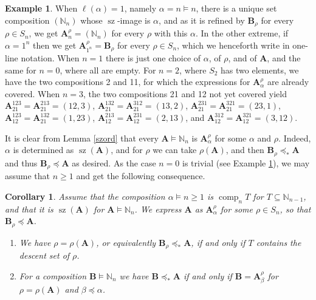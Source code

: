 \documentclass{article}
\newtheorem{cor}[thm]{Corollary}
\theoremstyle{definition}
\newtheorem{ex}[thm]{Example}
\begin{document}
\begin{ex}
When $\ell(\alpha)=1$, namely $\alpha=n \vDash n$, there is a unique set composition $(\mathbb{N}_{n})$ whose $\operatorname{sz}$-image is $\alpha$, and as it is refined by $\mathbf{B}_{\rho}$ for every $\rho \in S_{n}$, we get $\mathbf{A}_{n}^{\rho}=(\mathbb{N}_{n})$ for every $\rho$ with this $\alpha$. In the other extreme, if $\alpha=1^{n}$ then we get $\mathbf{A}_{1^{n}}^{\rho}=\mathbf{B}_{\rho}$ for every $\rho \in S_{n}$, which we henceforth write in one-line notation. When $n=1$ there is just one choice of $\alpha$, of $\rho$, and of $\mathbf{A}$, and the same for $n=0$, where all are empty. For $n=2$, where $S_{2}$ has two elements, we have the two compositions 2 and 11, for which the expressions for $\mathbf{A}_{\alpha}^{\rho}$ are already covered. When $n=3$, the two compositions 21 and 12 not yet covered yield $\mathbf{A}_{21}^{123}=\mathbf{A}_{21}^{213}=(12,3)$, $\mathbf{A}_{21}^{132}=\mathbf{A}_{21}^{312}=(13,2)$, $\mathbf{A}_{21}^{231}=\mathbf{A}_{21}^{321}=(23,1)$, $\mathbf{A}_{12}^{123}=\mathbf{A}_{21}^{132}=(1,23)$, $\mathbf{A}_{12}^{213}=\mathbf{A}_{12}^{231}=(2,13)$, and $\mathbf{A}_{12}^{312}=\mathbf{A}_{12}^{321}=(3,12)$. \label{Aalpharhoex}
\end{ex}
It is clear from Lemma \ref{szord} that every $\mathbf{A}\vDash\mathbb{N}_{n}$ is $\mathbf{A}_{\alpha}^{\rho}$ for some $\alpha$ and $\rho$. Indeed, $\alpha$ is determined as $\operatorname{sz}(\mathbf{A})$, and for $\rho$ we can take $\rho(\mathbf{A})$, and then $\mathbf{B}_{\rho}\preceq_{*}\mathbf{A}$ and thus $\mathbf{B}_{\rho}\preceq\mathbf{A}$ as desired. As the case $n=0$ is trivial (see Example \ref{Aalpharhoex}), we may assume that $n\geq1$ and get the following consequence.
\begin{cor}
Assume that the composition $\alpha \vDash n\geq1$ is $\operatorname{comp}_{n}T$ for $T\subseteq\mathbb{N}_{n-1}$, and that it is $\operatorname{sz}(\mathbf{A})$ for $\mathbf{A}\vDash\mathbb{N}_{n}$. We express $\mathbf{A}$ as $\mathbf{A}_{\alpha}^{\rho}$ for some $\rho \in S_{n}$, so that $\mathbf{B}_{\rho}\preceq\mathbf{A}$.
\begin{enumerate}[$(i)$]
\item We have $\rho=\rho(\mathbf{A})$, or equivalently $\mathbf{B}_{\rho}\preceq_{*}\mathbf{A}$, if and only if $T$ contains the descent set of $\rho$.
\item For a composition $\mathbf{B}\vDash\mathbb{N}_{n}$ we have $\mathbf{B}\preceq_{*}\mathbf{A}$ if and only if $\mathbf{B}=\mathbf{A}_{\beta}^{\rho}$ for $\rho=\rho(\mathbf{A})$ and $\beta\preceq\alpha$.
\end{enumerate} \label{weakord}
\end{cor}
\end{document}

